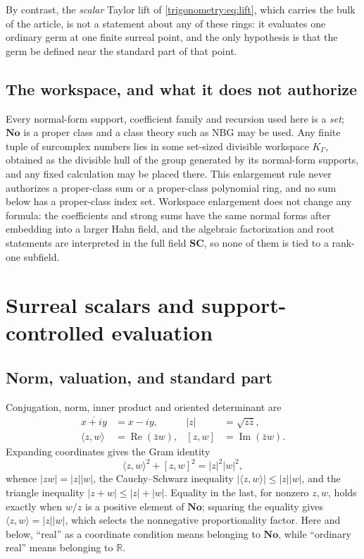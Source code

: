 \documentclass[11pt,letterpaper]{article}
\numberwithin{equation}{section}
\theoremstyle{definition}
\theoremstyle{remark}
\newcommand{\No}{\mathbf{No}}
\newcommand{\SC}{\mathbf{SC}}
\newcommand{\R}{\mathbb R}
\newcommand{\re}{\operatorname{Re}}
\newcommand{\im}{\operatorname{Im}}
\begin{document}
By contrast, the \emph{scalar} Taylor lift of \cref{trigonometry:eq:lift}, which carries the bulk
of the article, is not a statement about any of these rings: it evaluates one ordinary germ at one
finite surreal point, and the only hypothesis is that the germ be defined near the standard part of
that point.

\subsection{The workspace, and what it does not authorize}
Every normal-form support, coefficient family and recursion used here is a \emph{set}; $\No$ is a
proper class and a class theory such as NBG may be used. Any finite tuple of surcomplex numbers
lies in some set-sized divisible workspace $K_\Gamma$, obtained as the divisible hull of the group
generated by its normal-form supports, and any fixed calculation may be placed there. This
enlargement rule never authorizes a proper-class sum or a proper-class polynomial ring, and no
sum below has a proper-class index set. Workspace enlargement does not change any formula: the
coefficients and strong sums have the same normal forms after embedding into a larger Hahn field,
and the algebraic factorization and root statements are interpreted in the full field $\SC$, so
none of them is tied to a rank-one subfield.

\section{Surreal scalars and support-controlled evaluation}\label{trigonometry:sec:foundations}

\subsection{Norm, valuation, and standard part}
Conjugation, norm, inner product and oriented determinant are
\begin{align}
 \overline{x+iy}&=x-iy,& |z|&=\sqrt{z\bar z},\\
 \langle z,w\rangle&=\re(\bar zw),&[z,w]&=\im(\bar zw).
 \label{trigonometry:eq:dotcross}
\end{align}
Expanding coordinates gives the Gram identity
\begin{equation}\label{trigonometry:eq:gram}
 \langle z,w\rangle^2+[z,w]^2=|z|^2|w|^2,
\end{equation}
whence $|zw|=|z||w|$, the Cauchy--Schwarz inequality $|\langle z,w\rangle|\le|z||w|$, and the
triangle inequality $|z+w|\le|z|+|w|$. Equality in the last, for nonzero $z,w$, holds exactly when
$w/z$ is a positive element of $\No$; squaring the equality gives
$\langle z,w\rangle=|z||w|$, which selects the nonnegative proportionality factor. Here and below,
``real'' as a coordinate condition means belonging to $\No$, while ``ordinary real'' means
belonging to $\R$.
\end{document}
